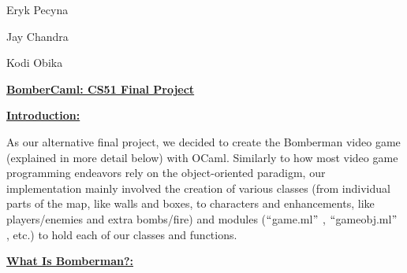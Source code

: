 \documentclass[12pt]{article}
\begin{document}
\begin{FlushRight}
Eryk Pecyna
\end{FlushRight}\par

\begin{FlushRight}
Jay Chandra
\end{FlushRight}\par

\begin{FlushRight}
Kodi Obika
\end{FlushRight}\par

\begin{Center}
\textbf{\uline{BomberCaml: CS51 Final Project}}
\end{Center}\par


\vspace{\baselineskip}
\textbf{\uline{Introduction:}}\par

As our alternative final project, we decided to create the Bomberman video game (explained in more detail below) with OCaml. Similarly to how most video game programming endeavors rely on the object-oriented paradigm, our implementation mainly involved the creation of various classes (from individual parts of the map, like walls and boxes, to characters and enhancements, like players/enemies and extra bombs/fire) and modules ($``$game.ml$"$ , $``$gameobj.ml$"$ , etc.) to hold each of our classes and functions.\par


\vspace{\baselineskip}
\textbf{\uline{What Is Bomberman?:}}\par
\end{document}

